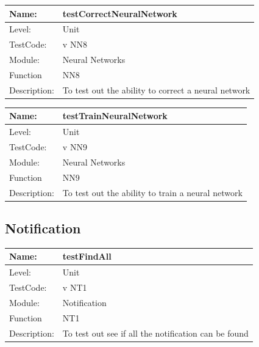 \documentclass[12pt]{article}
\begin{document}
\begin{center}
\begin{tabular}{|l|p{12cm}|}
\hline

 Name: & testCorrectNeuralNetwork \\
 \hline
Level: & Unit \\
\hline
TestCode: & v NN8 \\
\hline
Module:& Neural Networks \\
\hline
Function & NN8 \\
\hline
Description: & To test out the ability to correct a neural network   \\
\hline
\end{tabular}
\end{center}


\begin{center}
\begin{tabular}{|l|p{12cm}|}
\hline

 Name: & testTrainNeuralNetwork \\
 \hline
Level: & Unit \\
\hline
TestCode: & v NN9 \\
\hline
Module:& Neural Networks \\
\hline
Function & NN9 \\
\hline
Description: & To test out the ability to train a neural network   \\
\hline
\end{tabular}
\end{center}

\subsection{Notification}
\begin{center}
\begin{tabular}{|l|p{12cm}|}
\hline

 Name: & testFindAll  \\
\hline
Level: & Unit \\
\hline
TestCode: & v NT1 \\
\hline
Module:& Notification\\
\hline
Function & NT1 \\
\hline
Description: & To test out see if all the notification can be found \\
\hline

\end{tabular}
\end{center}
\end{document}
